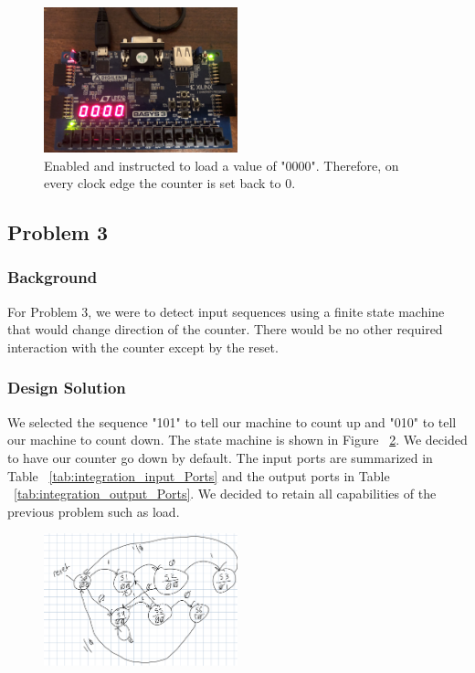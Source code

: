\documentclass[11pt]{article}
\begin{document}
\begin{figure}[H]
\begin{center}
	\includegraphics[width=0.5\textwidth]{./images/p2/IMG_1013.jpg}
	\caption{\label{fig:advanced_counter_res7}Enabled and instructed to load a value of "0000". Therefore, on every clock edge the counter is set back to 0.}
\end{center}
\end{figure}

\subsection{Problem 3}

\subsubsection{Background}
For Problem 3, we were to detect input sequences using a finite state machine that would change direction of the counter. There would be no other required interaction with the counter except by the reset.

\subsubsection{Design Solution}
We selected the sequence "101" to tell our machine to count up and "010" to tell our machine to count down. The state machine is shown in Figure ~\ref{fig:state_diagram}. We decided to have our counter go down by default. The input ports are summarized in Table ~\ref{tab:integration_input_Ports} and the output ports in Table ~\ref{tab:integration_output_Ports}. We decided to retain all capabilities of the previous problem such as load.

\begin{figure}[H]
\begin{center}
	\includegraphics[width=0.5\textwidth]{./images/statediagram.png}
	\caption{\label{fig:state_diagram}}
\end{center}
\end{figure}
\end{document}
